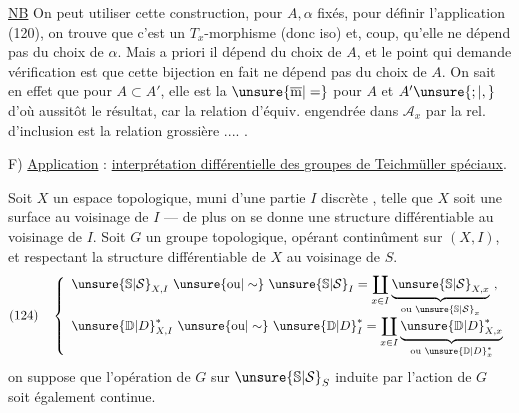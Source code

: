 \uline{NB} On peut utiliser cette construction, pour $A,\alpha$ fixés,
pour définir l'application (120), on trouve que c'est un
$T_x$-morphisme (donc iso) et,
coup, qu'elle ne dépend pas du choix de $\alpha$.
Mais a priori il dépend  du choix de $A$, et le point qui
demande vérification est que cette bijection en fait ne dépend pas du choix
de $A$. On sait en effet que pour $A\subset A'$, elle est la
$\unsure{\overline{\mathrm m}|=}$ pour $A$ et $A'\unsure{;|,}$
d'où aussitôt le résultat, car la relation d'équiv. engendrée dans
$\mathcal{A}_x$ par la rel. d'inclusion est la relation grossière .... .




F) \uline{Application} : \uline{interprétation différentielle des groupes
de Teichmüller spéciaux}.

Soit $X$ un espace topologique, muni d'une partie $I$ discrète
, telle que $X$ soit une surface au voisinage de $I$ ---
de plus on se donne une structure différentiable 
au voisinage de $I$. Soit $G$  un groupe
topologique, opérant continûment sur $(X,I)$, et respectant la structure
différentiable de $X$ au voisinage de $S$. 
\[
(124)\quad\left\{\begin{array}{l}
\unsure{\mathbb{S}|\mathcal{S}}_{X,I}\ \unsure{\text{ou}|\sim}\ \unsure{\mathbb{S}|\mathcal{S}}_I
=\displaystyle\coprod_{x\in I}
\underbrace{\unsure{\mathbb{S}|\mathcal{S}}_{X,x}}_{\text{ou }\unsure{\mathbb{S}|\mathcal{S}}_x}\ ,\\[8pt]
\unsure{\mathbb{D}|D}_{X,I}^{*}\ \unsure{\text{ou}|\sim}\ \unsure{\mathbb{D}|D}_{I}^{*}
=\displaystyle\coprod_{x\in I}
\underbrace{\unsure{\mathbb{D}|D}_{X,x}^{*}}_{\text{ou }\unsure{\mathbb{D}|D}_x^{*}}
\end{array}\right.
\]
on suppose que l'opération de $G$ sur $\unsure{\mathbb{S}|\mathcal{S}}_S$ induite par
l'action de $G$ soit également continue.

